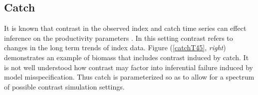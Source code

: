 \documentclass[12pt]{article}
\begin{document}



%




%


%
\subsection{Catch \label{catch}}	


%
It is known that contrast in the observed index and catch time series %
can effect inference on the productivity parameters . %
In this setting contrast refers to changes in the long term trends of index data. 
Figure (\ref{catchT45}, \emph{right}) demonstrates an example of biomass that 
includes contrast induced by catch. It is not well understood how contrast may 
factor into inferential failure induced by model misspecification. Thus catch 
is parameterized so as to allow for a spectrum of possible contrast simulation settings.
\end{document}
